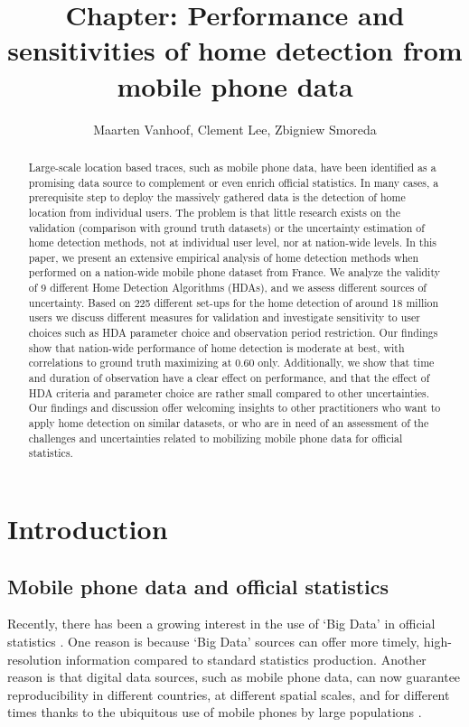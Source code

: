 \documentclass[a4paper]{article}
\title{Chapter: Performance and sensitivities of home detection from mobile phone data}
\date{} %
\author{Maarten Vanhoof, Clement Lee, Zbigniew Smoreda}
\begin{document}
\maketitle


\begin{abstract}
Large-scale location based traces, such as mobile phone data, have been identified as a promising data source to complement or even enrich official statistics. In many cases, a prerequisite step to deploy the massively gathered data is the detection of home location from individual users. The problem is that little research exists on the validation (comparison with ground truth datasets) or the uncertainty estimation of home detection methods, not at individual user level, nor at nation-wide levels. In this paper, we present an extensive empirical analysis of home detection methods when performed on a nation-wide mobile phone dataset from France. We analyze the validity of 9 different Home Detection Algorithms (HDAs), and we assess different sources of uncertainty. Based on 225 different set-ups for the home detection of around 18 million users we discuss different measures for validation and investigate sensitivity to user choices such as HDA parameter choice and observation period restriction. Our findings show that nation-wide performance of home detection is moderate at best, with correlations to ground truth maximizing at 0.60 only. Additionally, we show that time and duration of observation have a clear effect on performance, and that the effect of HDA criteria and parameter choice are rather small compared to other uncertainties. Our findings and discussion offer welcoming insights to other practitioners who want to apply home detection on similar datasets, or who are in need of an assessment of the challenges and uncertainties related to mobilizing mobile phone data for official statistics.
\end{abstract}

\section{Introduction}
\subsection{Mobile phone data and official statistics}
Recently, there has been a growing interest in the use of ‘Big Data’ in official statistics \cite{Daas2015,Vanhoof_JOS}. One reason is because ‘Big Data’ sources can offer more timely, high-resolution information compared to standard statistics production. Another reason is that digital data sources, such as mobile phone data, can now guarantee reproducibility in different countries, at different spatial scales, and for different times thanks to the ubiquitous use of mobile phones by large populations \cite{Pappalardo2016}. 
\end{document}
